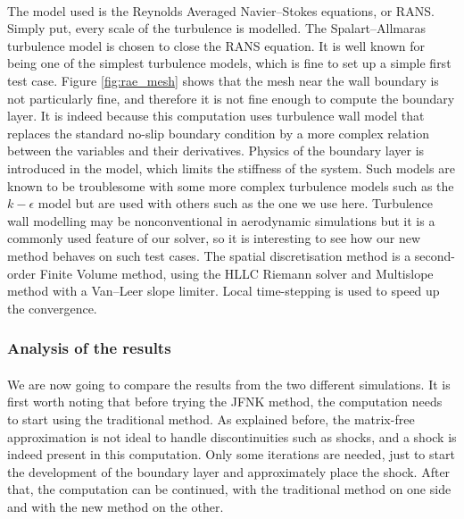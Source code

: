         \paragraph{}
        The model used is the Reynolds Averaged Navier--Stokes equations, or RANS.
        Simply put, every scale of the turbulence is modelled.
        The Spalart--Allmaras turbulence model is chosen to close the RANS equation.
        It is well known for being one of the simplest turbulence models, which is fine to set up a simple first test case.
        Figure \ref{fig:rae_mesh} shows that the mesh near the wall boundary is not particularly fine, and therefore it is not fine enough to compute the boundary layer.
        It is indeed because this computation uses turbulence wall model that replaces the standard no-slip boundary condition by a more complex relation between the variables and their derivatives.
        Physics of the boundary layer is introduced in the model, which limits the stiffness of the system.
        Such models are known to be troublesome with some more complex turbulence models such as the $k-\epsilon$ model but are used with others such as the one we use here.
        Turbulence wall modelling may be nonconventional in aerodynamic simulations but it is a commonly used feature of our solver, so it is interesting to see how our new method behaves on such test cases.
        The spatial discretisation method is a second-order Finite Volume method, using the HLLC Riemann solver and Multislope method \cite{LeTouzeMurroneGuillard2015} with a Van--Leer slope limiter.
        Local time-stepping is used to speed up the convergence.


      \subsubsection{Analysis of the results}

        \paragraph{}
        We are now going to compare the results from the two different simulations.
        It is first worth noting that before trying the JFNK method, the computation needs to start using the traditional method.
        As explained before, the matrix-free approximation is not ideal to handle discontinuities such as shocks, and a shock is indeed present in this computation.
        Only some iterations are needed, just to start the development of the boundary layer and approximately place the shock.
        After that, the computation can be continued, with the traditional method on one side and with the new method on the other.


